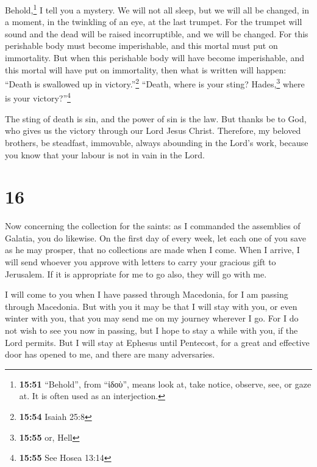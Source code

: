  Behold,\footnote{\textbf{15:51} ``Behold'', from
  ``ἰδοὺ'', means look at, take notice, observe, see, or gaze at. It is
  often used as an interjection.} I tell you a mystery. We will not all
sleep, but we will all be changed,  in a moment, in the
twinkling of an eye, at the last trumpet. For the trumpet will sound and
the dead will be raised incorruptible, and we will be changed.
 For this perishable body must become imperishable, and
this mortal must put on immortality.  But when this
perishable body will have become imperishable, and this mortal will have
put on immortality, then what is written will happen: ``Death is
swallowed up in victory.''\footnote{\textbf{15:54} Isaiah 25:8}
 ``Death, where is your sting? Hades,\footnote{\textbf{15:55}
  or, Hell} where is your victory?''\footnote{\textbf{15:55} See Hosea
  13:14}

 The sting of death is sin, and the power of sin is the
law.  But thanks be to God, who gives us the victory
through our Lord Jesus Christ.  Therefore, my beloved
brothers, be steadfast, immovable, always abounding in the Lord's work,
because you know that your labour is not in vain in the Lord.

\hypertarget{section-15}{%
\section{16}\label{section-15}}

 Now concerning the collection for the saints: as I
commanded the assemblies of Galatia, you do likewise.  On
the first day of every week, let each one of you save as he may prosper,
that no collections are made when I come.  When I arrive,
I will send whoever you approve with letters to carry your gracious gift
to Jerusalem.  If it is appropriate for me to go also,
they will go with me.

 I will come to you when I have passed through Macedonia,
for I am passing through Macedonia.  But with you it may
be that I will stay with you, or even winter with you, that you may send
me on my journey wherever I go.  For I do not wish to see
you now in passing, but I hope to stay a while with you, if the Lord
permits.  But I will stay at Ephesus until Pentecost,
 for a great and effective door has opened to me, and
there are many adversaries.

